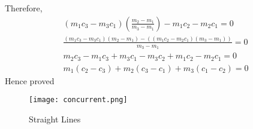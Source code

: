 \documentclass[12pt]{article}
\begin{document}
\begin{enumerate}
Therefore, \begin{align}
(m_1c_3-m_3c_1)(\frac{m_2-m_1}{m_3-m_1})-m_1c_2-m_2c_1=0\\
\frac{(m_1c_3-m_3c_1)(m_2-m_1)-((m_1c_2-m_2c_1)(m_3-m_1))}{m_3-m_1}=0\\
m_2c_3-m_1c_3+m_3c_1-m_3c_2+m_1c_2-m_2c_1=0\\
m_1(c_2-c_3)+m_2(c_3-c_1)+m_3(c_1-c_2) = 0
\end{align}
           Hence proved
   
\begin{figure}[h]
    \centering
    \texttt{[image: concurrent.png]}
    \caption{Straight Lines}
    \label{fig:concurrent.png}
\end{figure}
\end{enumerate}
\end{document}
